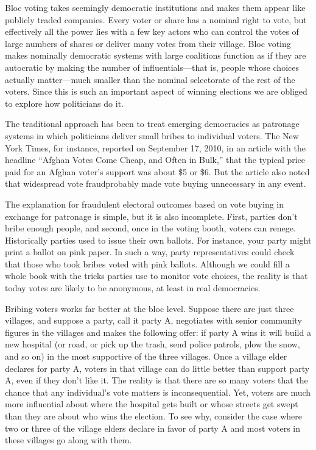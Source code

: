 \documentclass[10pt]{article}
\begin{document}
{\large Bloc voting takes seemingly democratic institutions and makes them
appear like publicly traded companies. Every voter or share has a nominal right
to vote, but effectively all the power lies with a few key actors who can control
the votes of large numbers of shares or deliver many votes from their village.
Bloc voting makes nominally democratic systems with large coalitions function as
if they are autocratic by making the number of influentials---that is, people
whose choices actually matter---much smaller than the nominal selectorate of the
rest of the voters. Since this is such an important aspect of winning elections
we are obliged to explore how politicians do it.}

{\large The traditional approach has been to treat emerging democracies as
patronage systems in which politicians deliver small bribes to individual voters.
The New York Times, for instance, reported on September 17, 2010, in an article
with the headline ``Afghan Votes Come Cheap, and Often in Bulk,'' that the
typical price paid for an Afghan voter's support was about \$5 or \$6. But the
article also noted that widespread vote fraudprobably made vote buying
unnecessary in any event.}

{\large The explanation for fraudulent electoral outcomes based on vote buying
in exchange for patronage is simple, but it is also incomplete. First, parties
don't bribe enough people, and second, once in the voting booth, voters can
renege. Historically parties used to issue their own ballots. For instance, your
party might print a ballot on pink paper. In such a way, party representatives
could check that those who took bribes voted with pink ballots. Although we could
fill a whole book with the tricks parties use to monitor vote choices, the
reality is that today votes are likely to be anonymous, at least in real
democracies.}

{\large Bribing voters works far better at the bloc level. Suppose there are
just three villages, and suppose a party, call it party A, negotiates with senior
community figures in the villages and makes the following offer: if party A wins
it will build a new hospital (or road, or pick up the trash, send police patrols,
plow the snow, and so on) in the most supportive of the three villages. Once a
village elder declares for party A, voters in that village can do little better
than support party A, even if they don't like it. The reality is that there are
so many voters that the chance that any individual's vote matters is
inconsequential. Yet, voters are much more influential about where the hospital
gets built or whose streets get swept than they are about who wins the election.
To see why, consider the case where two or three of the village elders declare in
favor of party A and most voters in these villages go along with them.}
\end{document}
